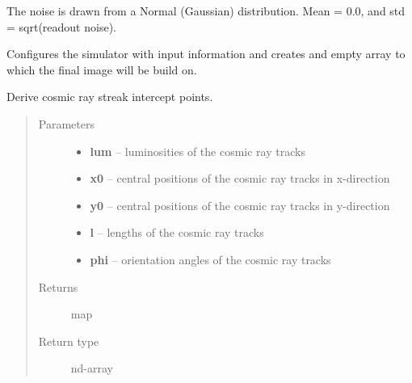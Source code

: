 \documentclass[a4paper,12pt,english]{sphinxmanual}
\begin{document}
\begin{fulllineitems}
\begin{fulllineitems}
The noise is drawn from a Normal (Gaussian) distribution.
Mean = 0.0, and std = sqrt(readout noise).

\end{fulllineitems}


\begin{fulllineitems}
\label{simulator:simulator.simulator.VISsimulator.configure}
Configures the simulator with input information and creates and empty array to which the final image will
be build on.

\end{fulllineitems}


\begin{fulllineitems}
\label{simulator:simulator.simulator.VISsimulator.cosmicRayIntercepts}
Derive cosmic ray streak intercept points.
\begin{quote}\begin{description}
\item[{Parameters}] \leavevmode\begin{itemize}
\item {} 
\textbf{lum} -- luminosities of the cosmic ray tracks

\item {} 
\textbf{x0} -- central positions of the cosmic ray tracks in x-direction

\item {} 
\textbf{y0} -- central positions of the cosmic ray tracks in y-direction

\item {} 
\textbf{l} -- lengths of the cosmic ray tracks

\item {} 
\textbf{phi} -- orientation angles of the cosmic ray tracks

\end{itemize}

\item[{Returns}] \leavevmode
map

\item[{Return type}] \leavevmode
nd-array

\end{description}\end{quote}


\end{fulllineitems}
\end{fulllineitems}
\end{document}
